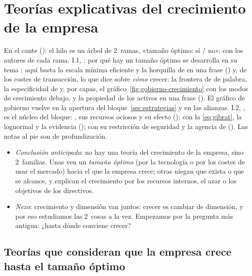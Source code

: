\documentclass[11pt]{article}
\begin{document}
\section{Teorías explicativas del crecimiento de la empresa}\label{sec:teorias}

\begin{notaopositor}
En el cante (): el hilo es un árbol de 2~ramas, «tamaño óptimo: sí / no», con los autores de cada rama. I.1, : por qué hay un tamaño óptimo se desarrolla en su tema ; aquí basta la escala mínima eficiente y la horquilla de  en una frase () y, de los costes de transacción, lo que dice sobre \emph{cómo} crecer: la frontera de  de palabra, la especificidad de  y, por capas, el gráfico~\ref{fig:gobierno-crecimiento} con los modos de crecimiento debajo, y la propiedad de los activos en una frase (). El gráfico de gobierno vuelve en la apertura del bloque~\ref{sec:estrategias} y en las alianzas. I.2, , es el núcleo del bloque: , sus recursos ociosos y su efecto ();  con la \eqref{eq:gibrat}, la lognormal y la evidencia ();  con su restricción de seguridad y la agencia de  (). Las notas al pie son de profundización.
\end{notaopositor}

\begin{itemize}
\item \emph{Conclusión anticipada}: no hay una teoría del crecimiento de la empresa, sino 2~familias. Unas ven un \emph{tamaño óptimo} (por la tecnología o por los costes de usar el mercado) hacia el que la empresa crece; otras niegan que exista o que se alcance, y explican el crecimiento por los recursos internos, el azar o los objetivos de los directivos.
\item \emph{Nexo}: crecimiento y dimensión van juntos: crecer es cambiar de dimensión, y por eso estudiamos las 2~cosas a la vez. Empezamos por la pregunta más antigua: ¿hasta dónde conviene crecer?
\end{itemize}

\subsection{Teorías que consideran que la empresa crece hasta el tamaño óptimo}\label{sec:tamano-optimo}
\end{document}
